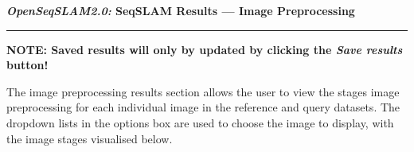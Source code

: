 \centerline{\textbf{\textit{OpenSeqSLAM2.0:} SeqSLAM Results --- Image Preprocessing}}
\noindent\rule{\textwidth}{2pt}
\centerline{\textbf{NOTE: Saved results will only by updated by clicking the \textit{Save results} button!}}
\bigskip
\parbox{\textwidth}{The image preprocessing results section allows the user to view the stages image preprocessing for each individual image in the reference and query datasets. The dropdown lists in the options box are used to choose the image to display, with the image stages visualised below. }
\bigskip
